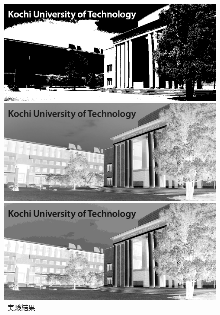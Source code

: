 \begin{figure}[H]
\begin{minipage}[b]{.23\textwidth}
        \centering
        \includegraphics[keepaspectratio,width=\textwidth]{../../Figures/05_24_1bit.png}
    \end{minipage}
    \caption{\kadaiab\ 実験結果}
    \begin{minipage}[b]{.23\textwidth}
        \centering
        \includegraphics[keepaspectratio,width=\textwidth]{../../Figures/05_31_8.png}
    \end{minipage}
    \begin{minipage}[b]{.23\textwidth}
        \centering
        \includegraphics[keepaspectratio,width=\textwidth]{../../Figures/05_32_4.png}
    \end{minipage}

\end{figure}

